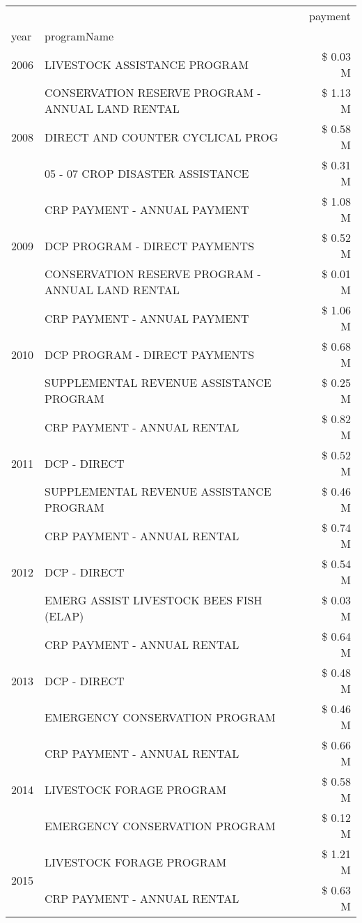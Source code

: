\begin{tabular}{llr}
\toprule
 &  & payment \\
year & programName &  \\
\midrule
2006 & LIVESTOCK ASSISTANCE PROGRAM & \$ 0.03 M \\
\cline{1-3}
\multirow[t]{3}{*}{2008} & CONSERVATION RESERVE PROGRAM - ANNUAL LAND RENTAL & \$ 1.13 M \\
 & DIRECT AND COUNTER CYCLICAL PROG & \$ 0.58 M \\
 & 05 - 07 CROP DISASTER ASSISTANCE & \$ 0.31 M \\
\cline{1-3}
\multirow[t]{3}{*}{2009} & CRP PAYMENT - ANNUAL PAYMENT & \$ 1.08 M \\
 & DCP PROGRAM - DIRECT PAYMENTS & \$ 0.52 M \\
 & CONSERVATION RESERVE PROGRAM - ANNUAL LAND RENTAL & \$ 0.01 M \\
\cline{1-3}
\multirow[t]{3}{*}{2010} & CRP PAYMENT - ANNUAL PAYMENT & \$ 1.06 M \\
 & DCP PROGRAM - DIRECT PAYMENTS & \$ 0.68 M \\
 & SUPPLEMENTAL REVENUE ASSISTANCE PROGRAM & \$ 0.25 M \\
\cline{1-3}
\multirow[t]{3}{*}{2011} & CRP PAYMENT - ANNUAL RENTAL & \$ 0.82 M \\
 & DCP - DIRECT & \$ 0.52 M \\
 & SUPPLEMENTAL REVENUE ASSISTANCE PROGRAM & \$ 0.46 M \\
\cline{1-3}
\multirow[t]{3}{*}{2012} & CRP PAYMENT - ANNUAL RENTAL & \$ 0.74 M \\
 & DCP - DIRECT & \$ 0.54 M \\
 & EMERG ASSIST LIVESTOCK BEES FISH (ELAP) & \$ 0.03 M \\
\cline{1-3}
\multirow[t]{3}{*}{2013} & CRP PAYMENT - ANNUAL RENTAL & \$ 0.64 M \\
 & DCP - DIRECT & \$ 0.48 M \\
 & EMERGENCY CONSERVATION PROGRAM & \$ 0.46 M \\
\cline{1-3}
\multirow[t]{3}{*}{2014} & CRP PAYMENT - ANNUAL RENTAL & \$ 0.66 M \\
 & LIVESTOCK FORAGE PROGRAM & \$ 0.58 M \\
 & EMERGENCY CONSERVATION PROGRAM & \$ 0.12 M \\
\cline{1-3}
\multirow[t]{3}{*}{2015} & LIVESTOCK FORAGE PROGRAM & \$ 1.21 M \\
 & CRP PAYMENT - ANNUAL RENTAL & \$ 0.63 M \\

\end{tabular}
